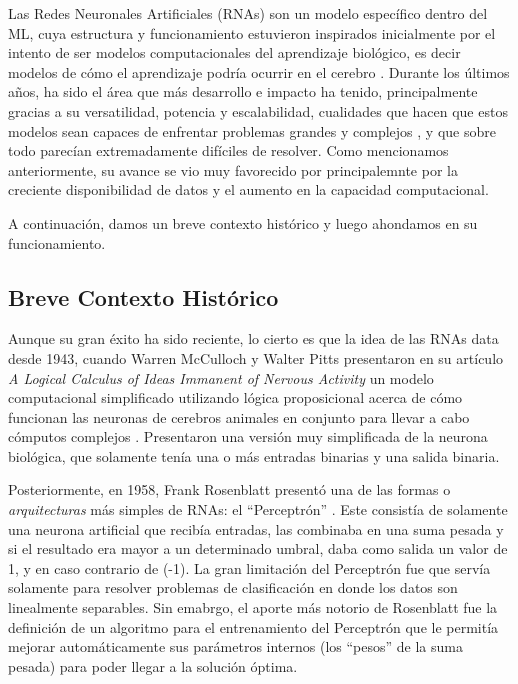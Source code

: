\documentclass[../../main.tex]{subfiles}
\begin{document}
Las Redes Neuronales Artificiales (RNAs) son un modelo específico dentro del ML, cuya
estructura y funcionamiento estuvieron inspirados inicialmente por el intento de ser
modelos computacionales del aprendizaje biológico, es decir modelos de cómo el aprendizaje
podría ocurrir en el cerebro \cite{deep-learning}. Durante los últimos años, ha sido el
área que más desarrollo e impacto ha tenido, principalmente gracias a su versatilidad,
potencia y escalabilidad, cualidades que hacen que estos modelos sean capaces de enfrentar
problemas grandes y complejos \cite{hands-on-ML-sklearn-tf}, y que sobre todo parecían
extremadamente difíciles de resolver. Como mencionamos anteriormente, su avance se vio muy
favorecido por principalemnte por la creciente disponibilidad de datos y el aumento en la
capacidad computacional.

A continuación, damos un breve contexto histórico y luego ahondamos en su funcionamiento.

\subsection{Breve Contexto Histórico}
Aunque su gran éxito ha sido reciente, lo cierto es que la idea de las RNAs data desde
1943, cuando Warren McCulloch y Walter Pitts presentaron en su artículo \textit{A Logical
Calculus of Ideas Immanent of Nervous Activity} \cite{mculloch-pitts-1943} un modelo
computacional simplificado utilizando lógica proposicional acerca de cómo funcionan las
neuronas de cerebros animales en conjunto para llevar a cabo cómputos complejos
\cite{hands-on-ML-sklearn-tf}. Presentaron una versión muy simplificada de la neurona
biológica, que solamente tenía una o más entradas binarias y una salida binaria.

Posteriormente, en 1958, Frank Rosenblatt presentó una de las formas o
\textit{arquitecturas} más simples de RNAs: el ``Perceptrón''
\cite{rosenblatt1958perceptron}. Este consistía de solamente una neurona artificial que
recibía entradas, las combinaba en una suma pesada y si el resultado era mayor a un
determinado umbral, daba como salida un valor de 1, y en caso contrario de (-1). La gran
limitación del Perceptrón fue que servía solamente para resolver problemas de
clasificación en donde los datos son linealmente separables. Sin emabrgo, el aporte más
notorio de Rosenblatt fue la definición de un algoritmo para el entrenamiento del
Perceptrón que le permitía mejorar automáticamente sus parámetros internos (los ``pesos''
de la suma pesada) para poder llegar a la solución óptima.
\end{document}
